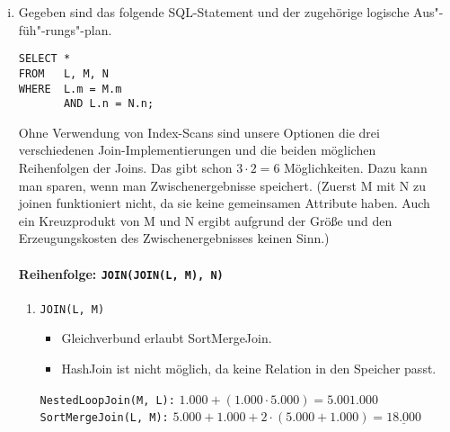 \begin{enumerate}[a)]
	\begin{enumerate}[i)]

		\item \label{Optimierung2_1} Gegeben sind das folgende SQL-Statement und der zugehörige logische Aus"-füh"-rungs"-plan.

		\begin{minipage}{5.5cm}
		\begin{lstlisting}
SELECT *
FROM   L, M, N
WHERE  L.m = M.m
       AND L.n = N.n;
		\end{lstlisting}
		\end{minipage}
		\begin{minipage}{7cm}
		\end{minipage}

\begin{solution}
		Ohne Verwendung von Index-Scans sind unsere Optionen die drei verschiedenen Join-Implementierungen und die beiden möglichen Reihenfolgen der Joins.
		Das gibt schon $3 \cdot 2 = 6$ Möglichkeiten.
		Dazu kann man sparen, wenn man Zwischenergebnisse speichert.
		(Zuerst M mit N zu joinen funktioniert nicht, da sie keine gemeinsamen Attribute haben.
		Auch ein Kreuzprodukt von M und N ergibt aufgrund der Größe und den Erzeugungskosten des Zwischenergebnisses keinen Sinn.)

		\paragraph{\color{solutioncolor}Reihenfolge: \texttt{JOIN(JOIN(L, M), N)}}

		\begin{enumerate}[1.]

			\item \texttt{JOIN(L, M)}
			  \begin{itemize}
				  \item Gleichverbund erlaubt SortMergeJoin.
				  \item HashJoin ist nicht möglich, da keine Relation in den Speicher passt.
			  \end{itemize}
			  \texttt{NestedLoopJoin(M, L):} $1.000 + (1.000 \cdot 5.000) = 5.001.000$ \\
			  \texttt{SortMergeJoin(L, M):} $5.000 + 1.000 + 2 \cdot (5.000 + 1.000) = \underline{18.000}$ \\


\end{enumerate}
\end{solution}
\end{enumerate}
\end{enumerate}
